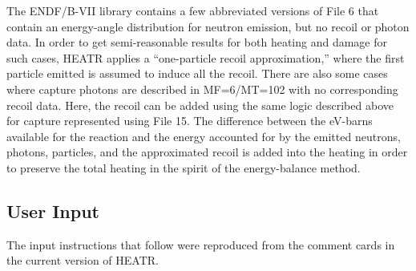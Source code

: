 The ENDF/B-VII library contains a few
abbreviated versions of File 6 that contain an
energy-angle distribution for neutron emission, but no
recoil or photon data.  In order to get semi-reasonable
results for both heating and damage for such cases, HEATR
applies a ``one-particle recoil approximation,''
where the first particle emitted is assumed to induce all
the recoil.  There are also some cases where capture photons
are described in MF=6/MT=102 with no corresponding recoil data.
Here, the recoil can be added using the same logic described
above for capture represented using File 15.  The difference
between the eV-barns available for the reaction and the energy
accounted for by the emitted neutrons, photons, particles, and
the approximated recoil is added into the heating in order to
preserve the total heating in the spirit of the energy-balance
method.


\subsection{User Input}
\label{ssHEATR_inp}

The input instructions that follow were reproduced from the
comment cards in the current version of HEATR.

